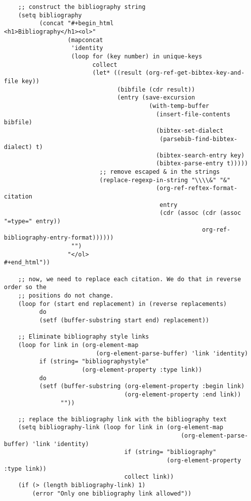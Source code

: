 \documentclass[11pt]{article}
\begin{document}
\begin{verbatim}
    ;; construct the bibliography string
    (setq bibliography
          (concat "#+begin_html
<h1>Bibliography</h1><ol>"
                  (mapconcat
                   'identity
                   (loop for (key number) in unique-keys
                         collect
                         (let* ((result (org-ref-get-bibtex-key-and-file key))
                                (bibfile (cdr result))
                                (entry (save-excursion
                                         (with-temp-buffer
                                           (insert-file-contents bibfile)
                                           (bibtex-set-dialect
                                            (parsebib-find-bibtex-dialect) t)
                                           (bibtex-search-entry key)
                                           (bibtex-parse-entry t)))))
                           ;; remove escaped & in the strings
                           (replace-regexp-in-string "\\\\&" "&"
                                           (org-ref-reftex-format-citation
                                            entry
                                            (cdr (assoc (cdr (assoc "=type=" entry))
                                                        org-ref-bibliography-entry-format))))))
                   "")
                  "</ol>
#+end_html"))

    ;; now, we need to replace each citation. We do that in reverse order so the
    ;; positions do not change.
    (loop for (start end replacement) in (reverse replacements)
          do
          (setf (buffer-substring start end) replacement))

    ;; Eliminate bibliography style links
    (loop for link in (org-element-map
                          (org-element-parse-buffer) 'link 'identity)
          if (string= "bibliographystyle"
                      (org-element-property :type link))
          do
          (setf (buffer-substring (org-element-property :begin link)
                                  (org-element-property :end link))
                ""))

    ;; replace the bibliography link with the bibliography text
    (setq bibliography-link (loop for link in (org-element-map
                                                  (org-element-parse-buffer) 'link 'identity)
                                  if (string= "bibliography"
                                              (org-element-property :type link))
                                  collect link))
    (if (> (length bibliography-link) 1)
        (error "Only one bibliography link allowed"))


\end{verbatim}
\end{document}
